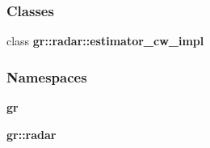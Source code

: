\subsubsection*{Classes}
\begin{DoxyCompactItemize}
\item 
class {\bf gr\+::radar\+::estimator\+\_\+cw\+\_\+impl}
\end{DoxyCompactItemize}
\subsubsection*{Namespaces}
\begin{DoxyCompactItemize}
\item 
 {\bf gr}
\item 
 {\bf gr\+::radar}
\end{DoxyCompactItemize}
